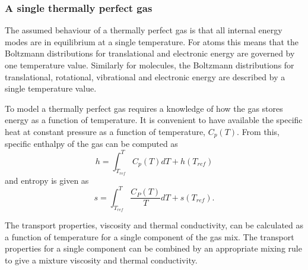 \subsubsection{A single thermally perfect gas}
%
The assumed behaviour of a thermally perfect gas is that
all internal energy modes are in equilibrium at a single temperature.
For atoms this means that the Boltzmann distributions for translational
and electronic energy are governed by one temperature value.
Similarly for molecules, the Boltzmann distributions for translational,
rotational, vibrational and electronic energy are described by
a single temperature value.

\medskip
To model a thermally perfect gas requires a knowledge
of how the gas stores energy as a function of temperature.
It is convenient to have available the specific
heat at constant pressure as a function of temperature, $C_p(T)$.
From this, specific enthalpy of the gas can be computed as
\begin{equation}
h = \int_{T_{ref}}^T C_p(T) dT + h(T_{ref})
\end{equation}
and entropy is given as
\begin{equation}
s = \int_{T_{ref}}^T \frac{C_P(T)}{T} dT + s(T_{ref}).
\end{equation}

\medskip
The transport properties, viscosity and thermal conductivity, can be calculated
as a function of temperature for a single component of the gas mix.
The transport properties for a single component can be combined by an appropriate
mixing rule to give a mixture viscosity and thermal conductivity.

